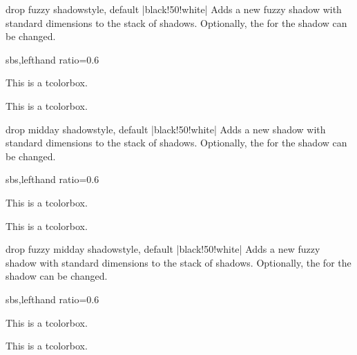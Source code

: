 \begin{docTcbKey}{drop fuzzy shadow}{}{style, default |black!50!white|}
  Adds a new fuzzy shadow with standard dimensions to the stack of shadows.
  Optionally, the  for the shadow can be changed.
\begin{dispExample*}{sbs,lefthand ratio=0.6}

\begin{tcolorbox}
This is a tcolorbox.
\end{tcolorbox}\par\bigskip
\begin{tcolorbox}[title=Another shadow,
  drop fuzzy shadow=blue]
This is a tcolorbox.
\end{tcolorbox}
\end{dispExample*}
\end{docTcbKey}


\begin{docTcbKey}{drop midday shadow}{}{style, default |black!50!white|}
  Adds a new shadow with standard dimensions to the stack of shadows.
  Optionally, the  for the shadow can be changed.
\begin{dispExample*}{sbs,lefthand ratio=0.6}

\begin{tcolorbox}
This is a tcolorbox.
\end{tcolorbox}\par\bigskip
\begin{tcolorbox}[title=Another shadow,
  drop midday shadow=blue]
This is a tcolorbox.
\end{tcolorbox}
\end{dispExample*}
\end{docTcbKey}

\begin{docTcbKey}{drop fuzzy midday shadow}{}{style, default |black!50!white|}
  Adds a new fuzzy shadow with standard dimensions to the stack of shadows.
  Optionally, the  for the shadow can be changed.
\begin{dispExample*}{sbs,lefthand ratio=0.6}

\begin{tcolorbox}
This is a tcolorbox.
\end{tcolorbox}\par\bigskip
\begin{tcolorbox}[title=Another shadow,
  drop fuzzy midday shadow=blue]
This is a tcolorbox.
\end{tcolorbox}
\end{dispExample*}
\end{docTcbKey}


